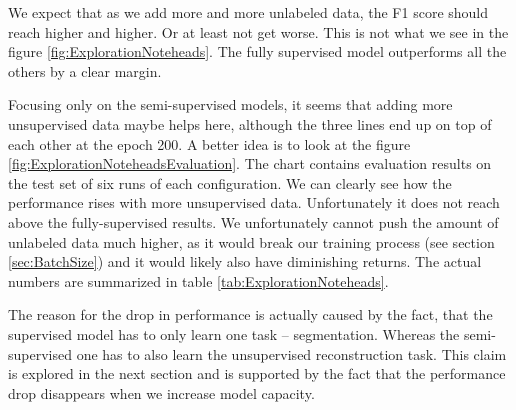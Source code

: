 We expect that as we add more and more unlabeled data, the F1 score should reach higher and higher. Or at least not get worse. This is not what we see in the figure \ref{fig:ExplorationNoteheads}. The fully supervised model outperforms all the others by a clear margin.

Focusing only on the semi-supervised models, it seems that adding more unsupervised data maybe helps here, although the three lines end up on top of each other at the epoch 200. A better idea is to look at the figure \ref{fig:ExplorationNoteheadsEvaluation}. The chart contains evaluation results on the test set of six runs of each configuration. We can clearly see how the performance rises with more unsupervised data. Unfortunately it does not reach above the fully-supervised results. We unfortunately cannot push the amount of unlabeled data much higher, as it would break our training process (see section \ref{sec:BatchSize}) and it would likely also have diminishing returns. The actual numbers are summarized in table \ref{tab:ExplorationNoteheads}.

The reason for the drop in performance is actually caused by the fact, that the supervised model has to only learn one task -- segmentation. Whereas the semi-supervised one has to also learn the unsupervised reconstruction task. This claim is explored in the next section and is supported by the fact that the performance drop disappears when we increase model capacity.

